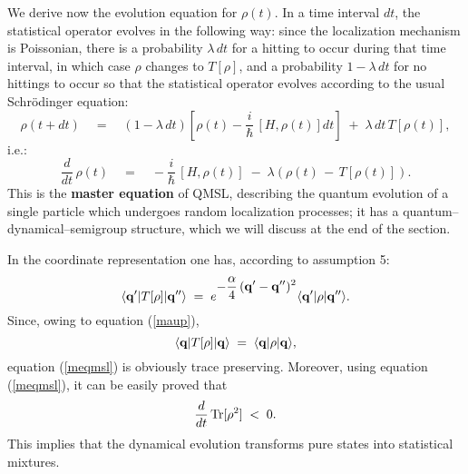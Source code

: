 \documentclass[12pt]{article}
\begin{document}
We  derive now the evolution equation for $\rho(t)$. In a time
interval $dt$, the statistical operator evolves in the following
way: since the localization mechanism is Poissonian, there is a
probability $\lambda\,dt$ for a hitting to occur during that time
interval, in which case $\rho$ changes to $T[\rho]$, and a
probability $1 - \lambda\,dt$ for no hittings to occur so that the
statistical operator evolves according to the usual Schr\"odinger
equation:
\[
\rho (t + dt) \quad = \quad (1 - \lambda\,dt) \left[ \rho(t) -
\frac{i}{\hbar}\, [H, \rho(t)] dt\right] \; + \; \lambda\, dt\,
T[\rho(t)],
\]
i.e.:
\begin{equation} \label{meqmsl}
\frac{d}{dt}\, \rho(t) \quad = \quad -\frac{i}{\hbar}\, [H,
\rho(t)] \; - \; \lambda\left(\rho(t)\, - \, T[\rho(t)] \right).
\end{equation}
This is the {\bf master equation} of QMSL, describing the quantum
evolution of a single particle which undergoes random localization
processes; it has a quantum--dynamical--semigroup structure, which
we will discuss at the end of the section.

In the coordinate representation one has, according to assumption
5:
\begin{equation} \label{maup}
\langle{\bf q}'|T[\rho]|{\bf q}''\rangle \; = \; e^{\displaystyle
-\frac{\alpha}{4}\, ({\bf q}' - {\bf q}'')^{2}} \langle{\bf
q}'|\rho|{\bf q}''\rangle.
\end{equation}
Since, owing to equation (\ref{maup}),
\begin{equation}
\langle{\bf q}|T[\rho]|{\bf q}\rangle \; = \; \langle{\bf
q}|\rho|{\bf q}\rangle,
\end{equation}
equation (\ref{meqmsl}) is obviously trace preserving. Moreover,
using equation (\ref{meqmsl}), it can be easily proved that
\begin{equation}
\frac{d}{dt}\, \makebox{Tr}[\rho^{2}] \; < \; 0.
\end{equation}
This implies that the dynamical evolution transforms pure states
into statistical mixtures.
\end{document}
